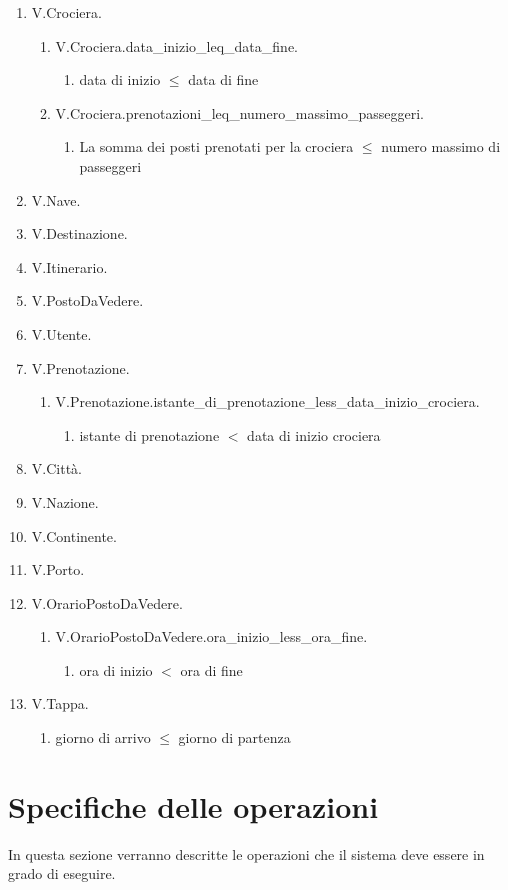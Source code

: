 \documentclass{article}
\begin{document}
\begin{enumerate}
    \item V.Crociera.
    \begin{enumerate}
        \item V.Crociera.data\_inizio\_leq\_data\_fine.
        \begin{enumerate}
            \item data di inizio $\leq$ data di fine
        \end{enumerate}
        \item V.Crociera.prenotazioni\_leq\_numero\_massimo\_passeggeri.
        \begin{enumerate}
            \item La somma dei posti prenotati per la crociera $\leq$ numero massimo di passeggeri
        \end{enumerate}
    \end{enumerate}
    \item V.Nave.
    \item V.Destinazione.
    \item V.Itinerario.
    \item V.PostoDaVedere.
    \item V.Utente.
    \item V.Prenotazione.
    \begin{enumerate}
        \item V.Prenotazione.istante\_di\_prenotazione\_less\_data\_inizio\_crociera.
        \begin{enumerate}
            \item istante di prenotazione $<$ data di inizio crociera
        \end{enumerate}
    \end{enumerate}
    \item V.Città.
    \item V.Nazione.
    \item V.Continente.
    \item V.Porto.
    \item V.OrarioPostoDaVedere.
    \begin{enumerate}
        \item V.OrarioPostoDaVedere.ora\_inizio\_less\_ora\_fine.
        \begin{enumerate}
            \item ora di inizio $<$ ora di fine
        \end{enumerate}
    \end{enumerate}
    \item V.Tappa.
    \begin{enumerate}
        \item giorno di arrivo $\leq$ giorno di partenza
    \end{enumerate}
\end{enumerate}


\newpage
\section{Specifiche delle operazioni}

In questa sezione verranno descritte le operazioni che il sistema deve essere in grado di eseguire.
\end{document}
